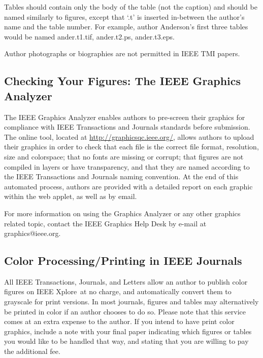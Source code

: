 \documentclass[journal,twoside,web]{ieeecolor}
\begin{document}
Tables should contain only the body of the table (not the caption) and 
should be named similarly to figures, except that `.t' is inserted 
in-between the author's name and the table number. For example, author 
Anderson's first three tables would be named ander.t1.tif, ander.t2.ps, ander.t3.eps.

Author photographs or biographies are not permitted in IEEE TMI papers.

\subsection{Checking Your Figures: The IEEE Graphics Analyzer}
The IEEE Graphics Analyzer enables authors to pre-screen their graphics for 
compliance with IEEE Transactions and Journals standards before submission. 
The online tool, located at \underline{http://graphicsqc.ieee.org/},
allows authors to upload their graphics in order to check that each file is the correct file format,
resolution, size and colorspace; that no fonts are missing or corrupt;
that figures are not compiled in layers or have transparency,
and that they are named according to the IEEE Transactions and Journals naming convention.
At the end of this automated process, authors are provided with 
a detailed report on each graphic within the web applet, as well as by email.

For more information on using the Graphics Analyzer or any other graphics 
related topic, contact the IEEE Graphics Help Desk by e-mail at 
graphics@ieee.org.

\subsection{Color Processing/Printing in IEEE Journals}
All IEEE Transactions, Journals, and Letters allow an author to publish 
color figures on IEEE Xplore\textregistered\ at no charge, and automatically 
convert them to grayscale for print versions. In most journals, figures and 
tables may alternatively be printed in color if an author chooses to do so. 
Please note that this service comes at an extra expense to the author. If 
you intend to have print color graphics, include a note with your final 
paper indicating which figures or tables you would like to be handled that way,
and stating that you are willing to pay the additional fee.
\end{document}
